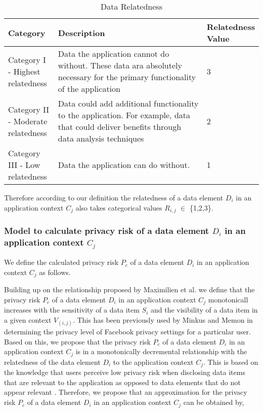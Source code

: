 \documentclass[10pt]{article}
\begin{document}
\begin{center}
\begin{table}[htbp]
\caption{Data Relatedness}
\begin{center}
\begin{adjustbox}{width=0.5\textwidth} 
\begin{tabular}{|p{0.2\linewidth}|p{0.7\linewidth}|p{0.1\linewidth}|} 
\hline
Category & Description & Relatedness Value \\
\hline
Category I - Highest relatedness & Data the application cannot do without. These data ara absolutely necessary for the primary functionality of the application & 3 \\
\hline
Category II - Moderate relatedness & Data could add additional functionality to the application. For example, data that could deliver benefits through data analysis techniques & 2 \\
\hline
Category III - Low relatedness & Data the application can do without. & 1 \\
\hline
\end{tabular}
\end{adjustbox}
\end{center}
\end{table}
\end{center} 
Therefore according to our definition the relatedness of a data element \textit {$D_i$} in an application context \textit {$C_j$} also takes categorical values \textit {$R_{i,j}$} $\in$ \{1,2,3\}.

\subsubsection {Model to calculate privacy risk of a data element \textit {$D_i$} in an application context \textit {$C_j$} }

We define the calculated privacy risk \textit{$P_c$} of a data element \textit {$D_i$} in an application context \textit {$C_j$} as follows.

Building up on the relationship proposed by Maximilien et al. \cite {maximilien2009privacy} we define that the privacy risk \textit{$P_c$} of a data element \textit {$D_i$} in an application context \textit {$C_j$}  monotonicall increases with the sensitivity of a data item \textit{$S_i$} and the visibility of a data item in a given context \textit{$V_{(i,j)}$}. This has been previously used by Minkus and Memon \cite{minkus2014scale} in determining the privacy level of Facebook privacy settings for a particular user. Based on this, we propose that the privacy risk \textit{$P_c$} of a data element \textit {$D_i$} in an application context \textit {$C_j$} is in a monotonically decremental relationship with the relatedness of the data element \textit {$D_i$} to the application context \textit {$C_j$}. This is based on the knowledge that users perceive low privacy risk when disclosing data items that are relevant to the application as opposed to data elements that do not appear relevant \cite {knijnenburg2013helping}. Therefore, we propose that an approximation for the privacy risk \textit{$P_c$} of a data element \textit {$D_i$} in an application context \textit {$C_j$} can be obtained by,
\end{document}
